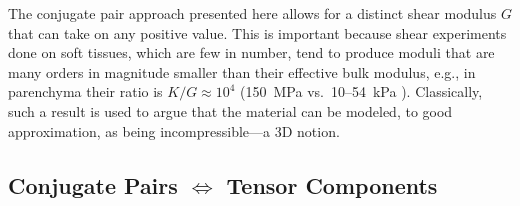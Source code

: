 The conjugate pair approach presented here allows for a distinct shear modulus $G$ that can take on any positive value.  This is important because shear experiments done on soft tissues, which are few in number, tend to produce moduli that are many orders in magnitude smaller than their effective bulk modulus, e.g., in parenchyma their ratio is $K/G \approx 10^{4}$ (150~MPa vs.\ 10--54~kPa \cite{Sarafetal07}).  Classically, such a result is used to argue that the material can be modeled, to  good approximation, as being incompressible---a 3D notion.

\subsection{Conjugate Pairs $\Longleftrightarrow$ Tensor Components}
\label{secConjugatePairs}

